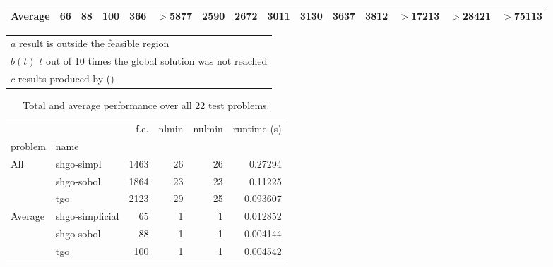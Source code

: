 \begin{landscape}
\begin{table}[htbp]
\begin{tabular}{lrrrrrrrrrrrrrr}
\cmidrule(lr){2-15}
Average  & 66 & 88 & 100 & 366 & $>$5877 & 2590 & 2672 & 3011 & 3130 & 3637 & 3812 & $>$17213 & $>$28421 & $>$75113 \\[0.05cm]
\bottomrule
\end{tabular}
\begin{tabular}{l}
$a$ result is outside the feasible region \\
$b(t)$ $t$ out of 10 times the global solution was not reached \\
$c$ results produced by \citeauthor{Paul2016} (\citeyear{Paul2016})
\end{tabular}
 \label{tab:lc_results}
\end{table}
\end{landscape}


\begin{table}[htbp]
\caption{Total and average performance over all 22 test problems.}
\begin{tabular}{llrrrr}
\toprule
    &                &  f.e. &  nlmin &  nulmin  &   runtime (s) \\
problem & name        &       &        &                  &           \\
\midrule
All & shgo-simpl     &  1463 &     26 &      26  &       0.27294 \\
    & shgo-sobol       &  1864 &     23 &      23 &       0.11225 \\
    & tgo       &  2123 &     29 &      25  &       0.093607 \\
Average & shgo-simplicial      &    65 &      1 &       1  &  0.012852 \\
    & shgo-sobol       &    88 &      1 &       1  &  0.004144 \\
    & tgo      &    100 &      1 &       1  &  0.004542 \\
\bottomrule
\end{tabular}
\label{tb:lc}
\end{table}


